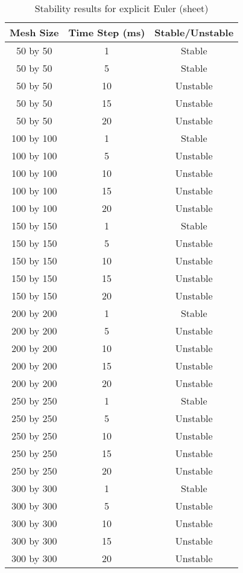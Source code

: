 \begin{table}[tp]
   \begin{minipage}{\textwidth}
      \begin{center}
         \begin{tabular}{c|c|c}
           Mesh Size & Time Step (ms) & Stable/Unstable\\
           \hline
           50 by 50 & 1 & Stable\\
           50 by 50 & 5 & Stable\\
           50 by 50 & 10 & Unstable\\
           50 by 50 & 15 & Unstable\\
           50 by 50 & 20 & Unstable\\
           100 by 100 & 1 & Stable\\
           100 by 100 & 5 & Unstable\\
           100 by 100 & 10 & Unstable\\
           100 by 100 & 15 & Unstable\\
           100 by 100 & 20 & Unstable\\           
           150 by 150 & 1 & Stable\\
           150 by 150 & 5 & Unstable\\
           150 by 150 & 10 & Unstable\\
           150 by 150 & 15 & Unstable\\
           150 by 150 & 20 & Unstable\\           
           200 by 200 & 1 & Stable\\
           200 by 200 & 5 & Unstable\\
           200 by 200 & 10 & Unstable\\
           200 by 200 & 15 & Unstable\\
           200 by 200 & 20 & Unstable\\           
           250 by 250 & 1 & Stable\\
           250 by 250 & 5 & Unstable\\
           250 by 250 & 10 & Unstable\\
           250 by 250 & 15 & Unstable\\
           250 by 250 & 20 & Unstable\\           
           300 by 300 & 1 & Stable\\
           300 by 300 & 5 & Unstable\\
           300 by 300 & 10 & Unstable\\
           300 by 300 & 15 & Unstable\\
           300 by 300 & 20 & Unstable\\
         \end{tabular}
      \end{center}
   \end{minipage}
   \caption{Stability results for explicit Euler (sheet)}
   \label{tab:ee stability sheet}
\end{table}
